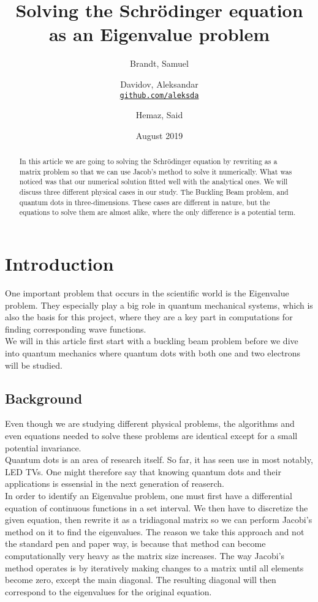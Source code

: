 \documentclass{article}
\title{Solving the Schrödinger equation as an Eigenvalue problem}
\author{
  Brandt, Samuel\\
  \and
  Davidov, Aleksandar\\
  \textcolor{blue}{\href{https://github.com/aleksda/FYS4150/}{\texttt{github.com/aleksda}}}
  \and
  Hemaz, Said\\
}
\date{August 2019}
\begin{document}
\maketitle
\begin{abstract}
In this article we are going to solving the Schrödinger equation by rewriting as a matrix problem so that we can use Jacob's method to solve it numerically. What was noticed was that our numerical solution fitted well with the analytical ones. We will discuss three different physical cases in our study. The Buckling Beam problem, and quantum dots in three-dimensions. These cases are different in nature, but the equations to solve them are almost alike, where the only difference is a potential term.
\end{abstract}

\tableofcontents

\newpage

\section{Introduction}
One important problem that occurs in the scientific world is the Eigenvalue problem. They especially play a big role in quantum mechanical systems, which is also the basis for this project, where they are a key part in computations for finding corresponding wave functions. \\
We will in this article first start with a buckling beam problem before we dive into quantum mechanics where quantum dots with both one and two electrons will be studied. 
\subsection{Background}
Even though we are studying different physical problems, the algorithms and even equations needed to solve these problems are identical except for a small potential invariance. \\
Quantum dots is an area of research itself. So far, it has seen use in most notably, LED TVs. One might therefore say that knowing quantum dots and their applications is essensial in the next generation of reaserch.  \\ In order to identify an Eigenvalue problem, one must first have a differential equation of continuous functions in a set interval. We then have to discretize the given equation, then rewrite it as a tridiagonal matrix so we can perform Jacobi's method on it to find the eigenvalues. The reason we take this approach and not the standard pen and paper way, is because that method can become computationally very heavy as the matrix size increases. The way Jacobi's method operates is by iteratively making changes to a matrix until all elements become zero, except the main diagonal. The resulting diagonal will then correspond to the eigenvalues for the original equation. 
\end{document}
